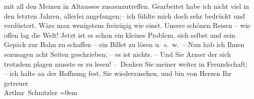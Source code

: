 \begin{ledgroupsized}[t]{13cm}
               mit all den Meinen in Altaussee zusa{\geminationm}enzutreffen.\pend
           \pstart
           Gearbeitet habe ich nicht viel in den letzten Jahren, allerlei angefangen;– ich
               fühlte mich doch sehr bedrückt und verdüstert. Wäre man wenigstens freizügig wie
               einst. Unsere schönen Reisen – wie offen lag die Welt! Jetzt ist es schon ein kleines
               Problem, sich selbst und sein Gepäck zur Bahn zu schaffen – ein Billet zu lösen
               u. s. w. –\pend
           \pstart
           Nun hab ich Ihnen sozusagen acht Seiten geschrieben; – es ist nichts. – Und Sie Armer
               der sich trotzdem plagen musste es zu lesen!\pend
           \pstart
           – Denken Sie meiner weiter in Freundschaft; – ich halte an der Hoffnung fest, Sie
               wiederzusehen, und bin von Herzen\pend
           \pstart
           Ihr getreuer{\\[\baselineskip]}\spacefill\mbox{Arthur Schnitzler}\pend
           \leftskip=0em{}
         
         \endnumbering{}\end{ledgroupsized}  \newcommand{\dateiname}{L02353}\newcommand{\titel}{Arthur Schnitzler an Georg Brandes, 16. 8. 1920}\newcommand{\editorInnen}{Martin Anton Müller und Gerd-Hermann Susen}
      